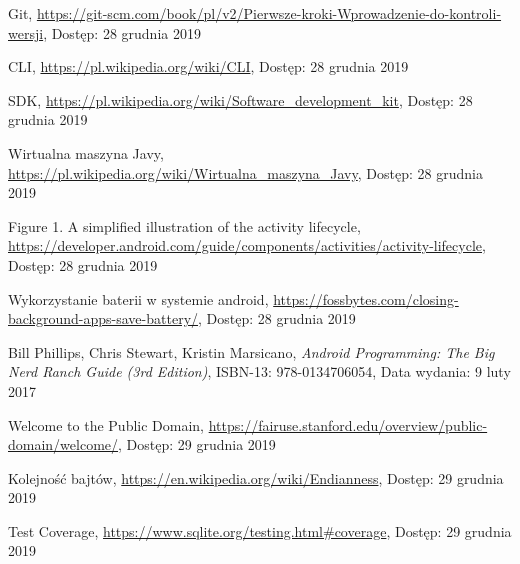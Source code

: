 \documentclass[a4paper,12pt, twoside]{article}
\begin{document}
\begin{thebibliography}{}
		Git,
		\newline\url{https://git-scm.com/book/pl/v2/Pierwsze-kroki-Wprowadzenie-do-kontroli-wersji}, 
		\newline Dostęp: 28 grudnia 2019

		CLI,
		\newline\url{https://pl.wikipedia.org/wiki/CLI}, 
		\newline Dostęp: 28 grudnia 2019
		
		SDK,
		\newline\url{https://pl.wikipedia.org/wiki/Software_development_kit}, 
		\newline Dostęp: 28 grudnia 2019
		
		Wirtualna maszyna Javy,
		\newline\url{https://pl.wikipedia.org/wiki/Wirtualna_maszyna_Javy}, 
		\newline Dostęp: 28 grudnia 2019
		
		Figure 1. A simplified illustration of the activity lifecycle,
		\newline\url{https://developer.android.com/guide/components/activities/activity-lifecycle}, 
		\newline Dostęp: 28 grudnia 2019
		
		Wykorzystanie baterii w systemie android,
		\newline\url{https://fossbytes.com/closing-background-apps-save-battery/}, 
		\newline Dostęp: 28 grudnia 2019
		
	    Bill Phillips, Chris Stewart, Kristin Marsicano, \textit{Android Programming: The Big Nerd Ranch Guide (3rd Edition)}, ISBN-13: 978-0134706054,
		\newline Data wydania: 9 luty 2017
		
		Welcome to the Public Domain,
		\newline\url{https://fairuse.stanford.edu/overview/public-domain/welcome/}, 
		\newline Dostęp: 29 grudnia 2019
		
		Kolejność bajtów,
		\newline\url{https://en.wikipedia.org/wiki/Endianness}, 
		\newline Dostęp: 29 grudnia 2019
		
		Test Coverage,
		\newline\url{https://www.sqlite.org/testing.html#coverage}, 
		\newline Dostęp: 29 grudnia 2019
		

\end{thebibliography}
\end{document}
